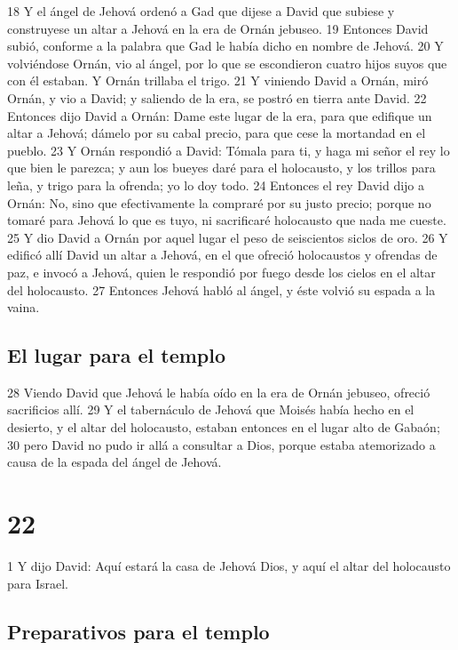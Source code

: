 18 Y el ángel de Jehová ordenó a Gad que dijese a David que subiese y construyese un altar a Jehová en la era de Ornán jebuseo.
19 Entonces David subió, conforme a la palabra que Gad le había dicho en nombre de Jehová.
20 Y volviéndose Ornán, vio al ángel, por lo que se escondieron cuatro hijos suyos que con él estaban. Y Ornán trillaba el trigo.
21 Y viniendo David a Ornán, miró Ornán, y vio a David; y saliendo de la era, se postró en tierra ante David.
22 Entonces dijo David a Ornán: Dame este lugar de la era, para que edifique un altar a Jehová; dámelo por su cabal precio, para que cese la mortandad en el pueblo.
23 Y Ornán respondió a David: Tómala para ti, y haga mi señor el rey lo que bien le parezca; y aun los bueyes daré para el holocausto, y los trillos para leña, y trigo para la ofrenda; yo lo doy todo.
24 Entonces el rey David dijo a Ornán: No, sino que efectivamente la compraré por su justo precio; porque no tomaré para Jehová lo que es tuyo, ni sacrificaré holocausto que nada me cueste.
25 Y dio David a Ornán por aquel lugar el peso de seiscientos siclos de oro.
26 Y edificó allí David un altar a Jehová, en el que ofreció holocaustos y ofrendas de paz, e invocó a Jehová, quien le respondió por fuego desde los cielos en el altar del holocausto.
27 Entonces Jehová habló al ángel, y éste volvió su espada a la vaina.
\section*{El lugar para el templo}

28 Viendo David que Jehová le había oído en la era de Ornán jebuseo, ofreció sacrificios allí.
29 Y el tabernáculo de Jehová que Moisés había hecho en el desierto, y el altar del holocausto, estaban entonces en el lugar alto de Gabaón;
30 pero David no pudo ir allá a consultar a Dios, porque estaba atemorizado a causa de la espada del ángel de Jehová.

\chapter{22}

1 Y dijo David: Aquí estará la casa de Jehová Dios, y aquí el altar del holocausto para Israel.

\section*{Preparativos para el templo}

